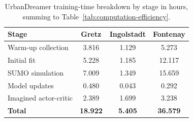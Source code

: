 \begin{table}[t]
  \centering
  \caption{UrbanDreamer training-time breakdown by stage in hours, summing to Table~\ref{tab:computation-efficiency}.}
  \renewcommand{\arraystretch}{1.0}
  \setlength{\tabcolsep}{6pt}
    \begin{tabular}{lccc}
      \toprule
      Stage & Gretz & Ingolstadt & Fontenay \\
      \midrule
      Warm-up collection & 3.816 & 1.129 & 5.273 \\
      Initial fit & 5.228 & 1.185 & 12.117 \\
      SUMO simulation & 7.009 & 1.349 & 15.659 \\
      Model updates & 0.480 & 0.043 & 0.292 \\
      Imagined actor-critic & 2.389 & 1.699 & 3.238 \\
      \textbf{Total} & \textbf{18.922} & \textbf{5.405} & \textbf{36.579} \\
      \bottomrule
    \end{tabular}
  \label{tab:online-wm-training-stage-time}
\end{table}
